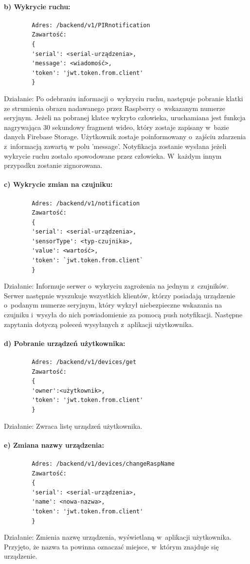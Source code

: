 \documentclass[polish,bachelor,a4paper,oneside]{ppfcmthesis}
\begin{document}
    \paragraph{b) Wykrycie ruchu:}
    \begin{verbatim}
        Adres: /backend/v1/PIRnotification
        Zawartość:
        {
        'serial': <serial-urządzenia>,
        'message': <wiadomość>,
        'token': 'jwt.token.from.client'
        }
    \end{verbatim}
    Działanie: Po odebraniu informacji o~wykryciu ruchu, następuje pobranie klatki ze strumienia obrazu nadawanego przez Raspberry o~wskazanym numerze seryjnym. Jeżeli na pobranej klatce wykryto człowieka, uruchamiana jest funkcja nagrywająca 30 sekundowy fragment wideo, który zostaje zapisany w~bazie danych Firebase Storage. Użytkownik zostaje poinformowany o~zajściu zdarzenia z~informacją zawartą w polu 'message'. Notyfikacja zostanie wysłana jeżeli wykrycie ruchu zostało spowodowane przez człowieka. W~każdym innym przypadku zostanie zignorowana.

    \paragraph{c) Wykrycie zmian na czujniku:}
    \begin{verbatim}
        Adres: /backend/v1/notification
        Zawartość:
        {
        'serial': <serial-urządzenia>,
        'sensorType': <typ-czujnika>,
        'value': <wartość>,
        'token': `jwt.token.from.client`
        }
    \end{verbatim}
    Działanie: Informuje serwer o~wykryciu zagrożenia na jednym z~czujników. Serwer następnie wyszukuje wszystkich klientów, którzy posiadają urządzenie o~podanym numerze seryjnym, który wykrył niebezpieczne wskazania na czujniku i~wysyła do nich powiadomienie za pomocą push notyfikacji. \newline
    Następne zapytania dotyczą poleceń wysyłanych z~aplikacji użytkownika.
    \paragraph{d) Pobranie urządzeń użytkownika:}
    \begin{verbatim}
        Adres: /backend/v1/devices/get
        Zawartość:
        {
        'owner':<użytkownik>,
        'token': 'jwt.token.from.client'
        }
    \end{verbatim}
    Działanie: Zwraca listę urządzeń użytkownika.
    \paragraph{e) Zmiana nazwy urządzenia:}
    \begin{verbatim}
        Adres: /backend/v1/devices/changeRaspName
        Zawartość:
        {
        'serial': <serial-urządzenia>,
        'name': <nowa-nazwa>,
        'token': 'jwt.token.from.client'
        }
    \end{verbatim}
    Działanie: Zmienia nazwę urządzenia, wyświetlaną w~aplikacji użytkownika. Przyjęto, że nazwa ta powinna oznaczać miejsce, w~którym znajduje się urządzenie.
\end{document}
